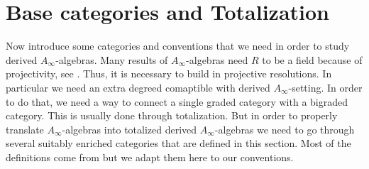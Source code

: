 \documentclass[Thesis.tex]{subfiles}
\begin{document}





\section{Base categories and Totalization}\label{categories}




Now introduce some categories and conventions that we need in order to study derived $A_\infty$-algebras. Many results of $A_\infty$-algebras need $R$ to be a field because of projectivity, see . Thus, it is necessary to build in projective resolutions. In particular we need an extra degreed comaptible with derived $A_\infty$-setting. In order to do that, we need a way to connect a single graded category with a bigraded category. This is usually done through totalization. But in order to properly translate $A_\infty$-algebras into totalized derived $A_\infty$-algebras we need to go through several suitably enriched categories that are defined in this section. Most of the definitions come from \cite[\S 2]{whitehouse} but we adapt them here to our conventions.
\end{document}
